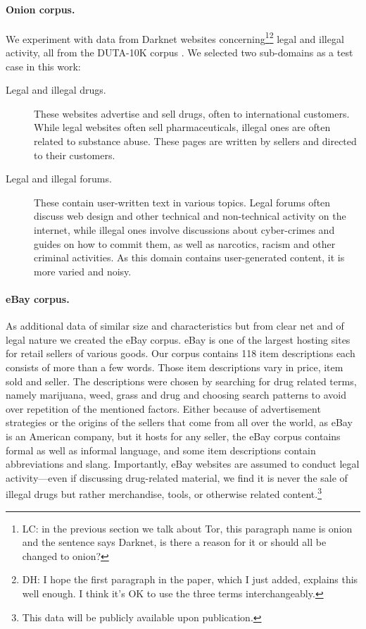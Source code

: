 \documentclass[11pt,a4paper,table]{article}
\newcommand{\lc}[1]{\footnote{\color{blue}LC: #1}}
\newcommand{\daniel}[1]{\footnote{\color{brown}DH: #1}}
\begin{document}
\paragraph{Onion corpus.}
We experiment with data from Darknet websites concerning\lc{in the previous section we talk about Tor, this paragraph name is onion and the sentence says Darknet, is there a reason for it or should all be changed to onion?}\daniel{I
hope the first paragraph in the paper, which I just added, explains this well
enough. I think it's OK to use the three terms interchangeably.}
legal and illegal activity, all from the DUTA-10K corpus \citep{AlNabki19}.
We selected two sub-domains as a test case in this work:
\begin{description}
  \item[Legal and illegal drugs.] These websites advertise and sell
  drugs, often to international customers.
  While legal websites often sell pharmaceuticals,
  illegal ones are often related to substance abuse.
  These pages are written by sellers and directed to their customers.
  \item[Legal and illegal forums.] These contain user-written text in various
  topics. Legal forums often discuss web design and other technical
  and non-technical activity on the internet, while illegal ones involve
  discussions about cyber-crimes and guides on how to commit them,
  as well as narcotics, racism and other criminal activities.
  As this domain contains user-generated content, it is more varied
  and noisy.
\end{description}

\paragraph{eBay corpus.}
As additional data of similar size and characteristics but from clear net and of legal nature we created the eBay corpus. eBay is one of the largest hosting sites for retail sellers of various goods. Our corpus contains 118 item descriptions each consists of more than a few words. Those item descriptions vary in price, item sold and seller. The descriptions were chosen by searching for drug related terms, namely marijuana, weed, grass and drug and choosing search patterns to avoid over repetition of the mentioned factors. Either because of advertisement strategies or the origins of the sellers that come from all over the world, as eBay is an American company, but it hosts for any seller, the eBay corpus contains formal as well as informal language, and some item descriptions contain abbreviations and slang.
Importantly, eBay websites are assumed to conduct legal activity---even
if discussing drug-related material, we find it is never the sale of illegal
drugs but rather merchandise, tools, or otherwise related content.\footnote{This 
data will be publicly available upon publication.}
\end{document}
